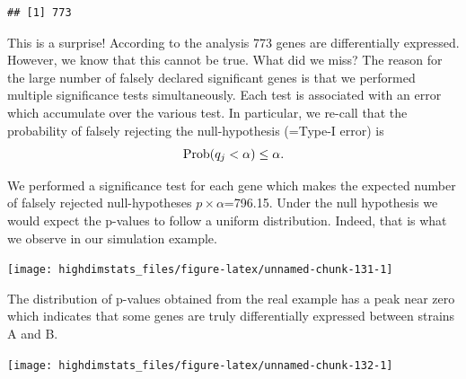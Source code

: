 \documentclass[
]{book}
\newenvironment{Shaded}{\begin{snugshade}}{\end{snugshade}}
\newcommand{\FloatTok}[1]{\textcolor[rgb]{0.00,0.00,0.81}{#1}}
\newcommand{\FunctionTok}[1]{\textcolor[rgb]{0.00,0.00,0.00}{#1}}
\newcommand{\NormalTok}[1]{#1}
\newcommand{\SpecialCharTok}[1]{\textcolor[rgb]{0.00,0.00,0.00}{#1}}
\begin{document}
\begin{Shaded}
\end{Shaded}

\begin{verbatim}
## [1] 773
\end{verbatim}

This is a surprise! According to the analysis 773 genes are differentially expressed. However, we know that this cannot be true. What did we miss? The reason for the large number of falsely declared significant genes is that we performed multiple significance tests simultaneously. Each test is associated with an error which accumulate over the various test. In particular, we re-call that the probability of falsely rejecting the null-hypothesis (=Type-I error) is
\[
{\rm Prob}(q_j<\alpha)\leq \alpha. 
\]

We performed a significance test for each gene which makes the expected number of falsely rejected null-hypotheses \(p\times\alpha\)=796.15. Under the null hypothesis we would expect the p-values to follow a uniform distribution. Indeed, that is what we observe in our simulation example.

\begin{Shaded}
\end{Shaded}

\begin{center}\texttt{[image: highdimstats\_files/figure-latex/unnamed-chunk-131-1]} \end{center}

The distribution of p-values obtained from the real example has a peak near zero which indicates that some genes are truly differentially expressed between strains A and B.

\begin{Shaded}
\end{Shaded}

\begin{center}\texttt{[image: highdimstats\_files/figure-latex/unnamed-chunk-132-1]} \end{center}
\end{document}
